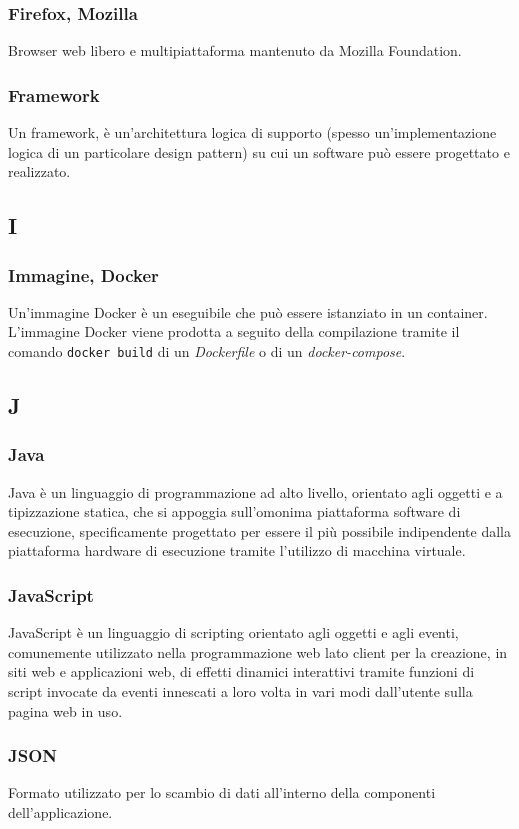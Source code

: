 \subsubsection{Firefox, Mozilla}
Browser web libero e multipiattaforma mantenuto da Mozilla Foundation.
\subsubsection{Framework}  Un framework, è un'architettura logica di supporto (spesso un'implementazione logica di un particolare design pattern) su cui un software può essere progettato e realizzato.
\subsection{I}
\subsubsection{Immagine, Docker} Un'immagine Docker è un eseguibile che può essere istanziato in un container. L'immagine Docker viene prodotta a seguito della compilazione tramite il comando \verb!docker build! di un \textit{Dockerfile} o di un \textit{docker-compose}.
\subsection{J}
\subsubsection{Java}  Java è un linguaggio di programmazione ad alto livello, orientato agli oggetti e a tipizzazione statica, che si appoggia sull'omonima piattaforma software di esecuzione, specificamente progettato per essere il più possibile indipendente dalla piattaforma hardware di esecuzione tramite l'utilizzo di macchina virtuale.
\subsubsection{JavaScript}  JavaScript è un linguaggio di scripting orientato agli oggetti e agli eventi, comunemente utilizzato nella programmazione web lato client per la creazione, in siti web e applicazioni web, di effetti dinamici interattivi tramite funzioni di script invocate da eventi innescati a loro volta in vari modi dall'utente sulla pagina web in uso.
\subsubsection{JSON}
Formato utilizzato per lo scambio di dati all'interno della componenti dell'applicazione.
